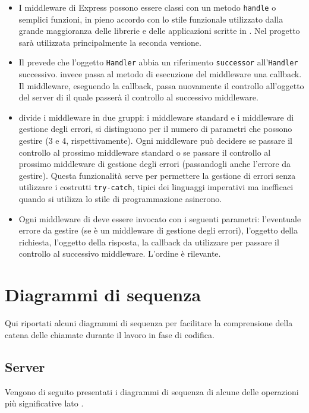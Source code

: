 \documentclass[12pt,a4paper]{article}
\begin{document}
\begin{itemize}
	\item I middleware di Express possono essere classi con un metodo \texttt{handle} o semplici funzioni, in pieno accordo con lo stile funzionale utilizzato dalla grande maggioranza delle librerie e delle applicazioni scritte in . Nel progetto sarà utilizzata principalmente la seconda versione.
	\item Il  prevede che l’oggetto \texttt{Handler} abbia un riferimento \texttt{successor} all’\texttt{Handler} successivo.  invece passa al metodo di esecuzione del middleware una callback. Il middleware, eseguendo la callback, passa nuovamente il controllo all’oggetto del server di  il quale passerà il controllo al successivo middleware.
	\item {} divide i middleware in due gruppi: i middleware standard e i middleware di gestione degli errori, si distinguono per il numero di parametri che possono gestire (3 e 4, rispettivamente). Ogni middleware può decidere se passare il controllo al prossimo middleware standard o se passare il controllo al prossimo middleware di gestione degli errori (passandogli anche l’errore da gestire). Questa funzionalità serve per permettere la gestione di errori senza utilizzare i costrutti \texttt{try-catch}, tipici dei linguaggi imperativi ma inefficaci quando si utilizza lo stile di programmazione asincrono.
	\item Ogni middleware di  deve essere invocato con i seguenti parametri: l’eventuale errore da gestire (se è un middleware di gestione degli errori), l’oggetto della richiesta, l’oggetto della risposta, la callback da utilizzare per passare il controllo al successivo middleware. L’ordine è rilevante.
\end{itemize}

\newpage

\section{Diagrammi di sequenza}
Qui riportati alcuni diagrammi di sequenza per facilitare la comprensione della catena delle chiamate durante il lavoro in fase di codifica.

\subsection{Server}
Vengono di seguito presentati i diagrammi di sequenza di alcune delle operazioni più significative lato .
\end{document}
